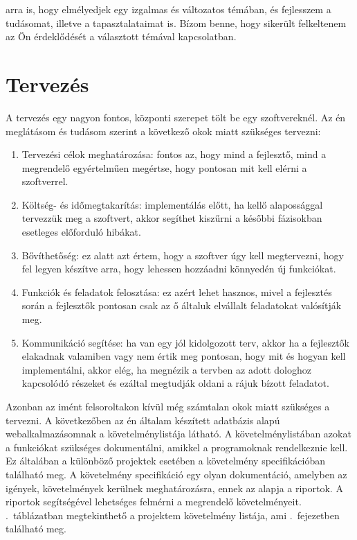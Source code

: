 \documentclass[]{thesis-ekf}
\theoremstyle{definition}
\theoremstyle{remark}
\begin{document}
arra is, hogy elmélyedjek egy izgalmas és változatos témában, és fejlesszem a tudásomat, illetve a tapasztalataimat is. Bízom benne, hogy sikerült felkeltenem az Ön érdeklődését a választott témával kapcsolatban. 
	
	\chapter{Tervezés}
		A tervezés egy nagyon fontos, központi szerepet tölt be egy szoftvereknél. Az én meglátásom és tudásom szerint a következő okok miatt szükséges tervezni:
		\begin{enumerate}
			\item Tervezési célok meghatározása: fontos az, hogy mind a fejlesztő, mind a megrendelő egyértelműen megértse, hogy pontosan mit kell elérni a szoftverrel.
			\item Költség- és időmegtakarítás: implementálás előtt, ha kellő alapossággal tervezzük meg a szoftvert, akkor segíthet kiszűrni a későbbi fázisokban esetleges előforduló hibákat. 
			\item Bővíthetőség: ez alatt azt értem, hogy a szoftver úgy kell megtervezni, hogy fel legyen készítve arra, hogy lehessen hozzáadni könnyedén új funkciókat.
			\item Funkciók és feladatok felosztása: ez azért lehet hasznos, mivel a fejlesztés során a fejlesztők pontosan csak az ő általuk elvállalt feladatokat valósítják meg.
			\item Kommunikáció segítése: ha van egy jól kidolgozott terv, akkor ha a fejlesztők elakadnak valamiben vagy nem értik meg pontosan, hogy mit és hogyan kell implementálni, akkor elég, ha megnézik a tervben az adott dologhoz kapcsolódó részeket és ezáltal megtudják oldani a rájuk bízott feladatot.
		\end{enumerate}
		Azonban az imént felsoroltakon kívül még számtalan okok miatt szükséges a tervezni. A következőben az én általam készített adatbázis alapú webalkalmazásomnak a követelménylistája látható. A követelménylistában azokat a funkciókat szükséges dokumentálni, amikkel a programoknak rendelkeznie kell. Ez általában a különböző projektek esetében a követelmény specifikációban található meg. A követelmény specifikáció egy olyan dokumentáció, amelyben az igények, követelmények kerülnek meghatározásra, ennek az alapja a riportok. A riportok segítségével lehetséges felmérni a megrendelő követelményeit. .~táblázatban megtekinthető a projektem követelmény listája, ami .~fejezetben található meg.
		
\end{document}
